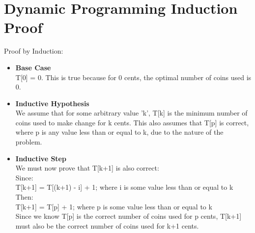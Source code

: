 \documentclass[11pt,letterpaper]{article}
\begin{document}
\section*{Dynamic Programming Induction Proof}
	Proof by Induction:
\begin{itemize}
	\item \textbf{Base Case}\\
	T[0] = 0. This is true because for 0 cents, the optimal number of coins used is 0.
	\item \textbf{Inductive Hypothesis}\\
	We assume that for some arbitrary value 'k', T[k] is the minimum number of coins used to make change for k cents. This also assumes that T[p] is correct, where p is any value less than or equal to k, due to the nature of the problem.
	\item \textbf{Inductive Step}\\
	We must now prove that T[k+1] is also correct:\\
	\hspace{15pt}Since:\\ 
	\hspace{30pt}T[k+1] = T[(k+1) - i] + 1; where i is some value less than or equal to k\\
	\hspace{15pt}Then:\\
	\hspace{30pt}T[k+1] = T[p] + 1; where p is some value less than or equal to k\\
	Since we know T[p] is the correct number of coins used for p cents, T[k+1] must also be the correct number of coins used for k+1 cents.
\end{itemize}	 
\end{document}
